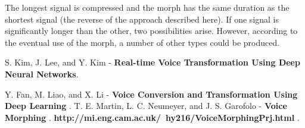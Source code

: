 \documentclass[12pt]{report}
\begin{document}
The longest signal is compressed and the morph has the same duration as the shortest signal (the reverse of the approach described here).  If one signal is significantly longer than the other, two possibilities arise. However, according to the eventual use of the morph, a number of other types could be produced.
\begin{thebibliography}{9}
S. Kim, J. Lee, and Y. Kim -
\textbf{Real-time Voice Transformation Using Deep Neural Networks}. 



Y. Fan, M. Liao, and X. Li -
\textbf{Voice Conversion and Transformation Using Deep Learning }. 
T. E. Martin, L. C. Neumeyer, and J. S. Garofolo -
\textbf{Voice Morphing }.
\textbf{http://mi.eng.cam.ac.uk/~hy216/VoiceMorphingPrj.html   }.
\end{thebibliography}
\end{document}
